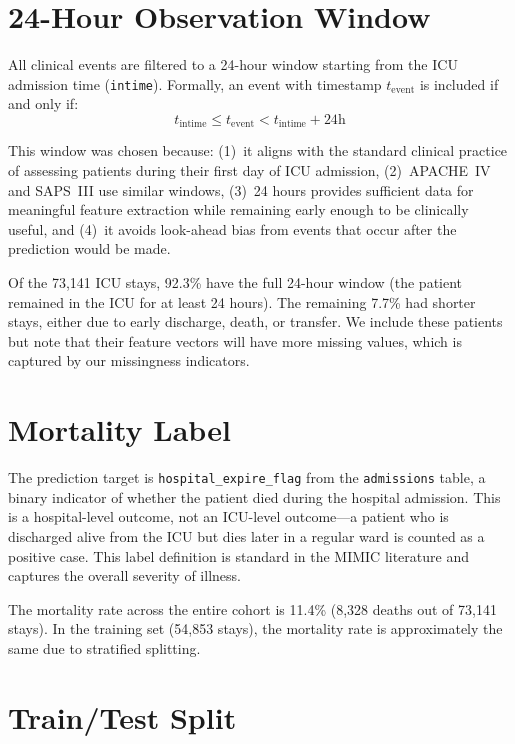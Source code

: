 \documentclass[11pt,a4paper]{report}
\begin{document}
\section{24-Hour Observation Window}

All clinical events are filtered to a 24-hour window starting from the ICU admission time (\texttt{intime}). Formally, an event with timestamp $t_{\text{event}}$ is included if and only if:
\begin{equation}
t_{\text{intime}} \leq t_{\text{event}} < t_{\text{intime}} + 24\text{h}
\end{equation}

This window was chosen because: (1)~it aligns with the standard clinical practice of assessing patients during their first day of ICU admission, (2)~APACHE~IV and SAPS~III use similar windows, (3)~24 hours provides sufficient data for meaningful feature extraction while remaining early enough to be clinically useful, and (4)~it avoids look-ahead bias from events that occur after the prediction would be made.

Of the 73,141 ICU stays, 92.3\% have the full 24-hour window (the patient remained in the ICU for at least 24 hours). The remaining 7.7\% had shorter stays, either due to early discharge, death, or transfer. We include these patients but note that their feature vectors will have more missing values, which is captured by our missingness indicators.

\section{Mortality Label}

The prediction target is \texttt{hospital\_expire\_flag} from the \texttt{admissions} table, a binary indicator of whether the patient died during the hospital admission. This is a hospital-level outcome, not an ICU-level outcome---a patient who is discharged alive from the ICU but dies later in a regular ward is counted as a positive case. This label definition is standard in the MIMIC literature and captures the overall severity of illness.

The mortality rate across the entire cohort is 11.4\% (8,328 deaths out of 73,141 stays). In the training set (54,853 stays), the mortality rate is approximately the same due to stratified splitting.

\section{Train/Test Split}
\end{document}
